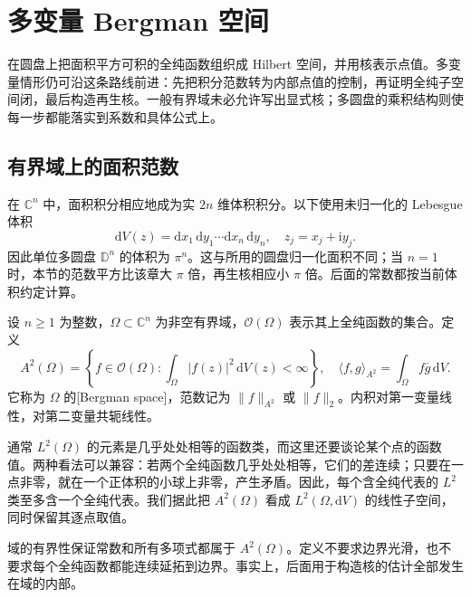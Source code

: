\section{多变量 Bergman 空间}
\label{b3:sec:2906}

在圆盘上把面积平方可积的全纯函数组织成 Hilbert 空间，并用核表示点值。多变量情形仍可沿这条路线前进：先把积分范数转为内部点值的控制，再证明全纯子空间闭，最后构造再生核。一般有界域未必允许写出显式核；多圆盘的乘积结构则使每一步都能落实到系数和具体公式上。

\subsection{有界域上的面积范数}
\label{b3:subsec:290601}

在 \(\mathbb C^n\) 中，面积积分相应地成为实 \(2n\) 维体积积分。以下使用未归一化的 Lebesgue 体积
\[
 \mathrm{d}V(z)=\mathrm{d}x_1\,\mathrm{d}y_1\cdots
 \mathrm{d}x_n\,\mathrm{d}y_n,
 \quad z_j=x_j+\mathrm{i}y_j.
\]
因此单位多圆盘 \(\mathbb D^n\) 的体积为 \(\pi^n\)。这与所用的圆盘归一化面积不同；当 \(n=1\) 时，本节的范数平方比该章大 \(\pi\) 倍，再生核相应小 \(\pi\) 倍。后面的常数都按当前体积约定计算。

\begin{definition}\label{b3:def:29-bergman-space}
设 \(n\ge1\) 为整数，\(\Omega\subset\mathbb C^n\) 为非空有界域，\(\mathcal O(\Omega)\) 表示其上全纯函数的集合。定义
\[
 A^2(\Omega)=\left\{f\in\mathcal O(\Omega):
       \int_\Omega |f(z)|^2\,\mathrm{d}V(z)<\infty\right\},
 \quad
 \langle f,g\rangle_{A^2}=\int_\Omega f\overline g\,\mathrm{d}V.
\]
它称为 \(\Omega\) 的[Bergman space]，范数记为 \(\|f\|_{A^2}\) 或 \(\|f\|_2\)。内积对第一变量线性，对第二变量共轭线性。
\end{definition}

通常 \(L^2(\Omega)\) 的元素是几乎处处相等的函数类，而这里还要谈论某个点的函数值。两种看法可以兼容：若两个全纯函数几乎处处相等，它们的差连续；只要在一点非零，就在一个正体积的小球上非零，产生矛盾。因此，每个含全纯代表的 \(L^2\) 类至多含一个全纯代表。我们据此把 \(A^2(\Omega)\) 看成 \(L^2(\Omega,\mathrm{d}V)\) 的线性子空间，同时保留其逐点取值。

\ProseParagraphBreak

域的有界性保证常数和所有多项式都属于 \(A^2(\Omega)\)。定义不要求边界光滑，也不要求每个全纯函数都能连续延拓到边界。事实上，后面用于构造核的估计全部发生在域的内部。

